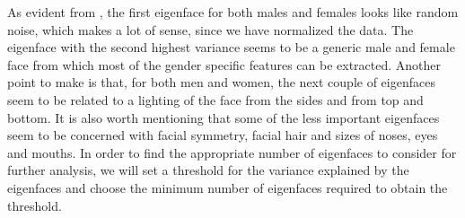 As evident from , the first eigenface for both males and females looks like random noise, which makes a lot of sense, since we have normalized the data. The eigenface with the second highest variance seems to be a generic male and female face from which most of the gender specific features can be extracted. Another point to make is that, for both men and women, the next couple of eigenfaces seem to be related to a lighting of the face from the sides and from top and bottom. It is also worth mentioning that some of the less important eigenfaces seem to be concerned with facial symmetry, facial hair and sizes of noses, eyes and mouths. In order to find the appropriate number of eigenfaces to consider for further analysis, we will set a threshold for the variance explained by the eigenfaces and choose the minimum number of eigenfaces required to obtain the threshold. 

